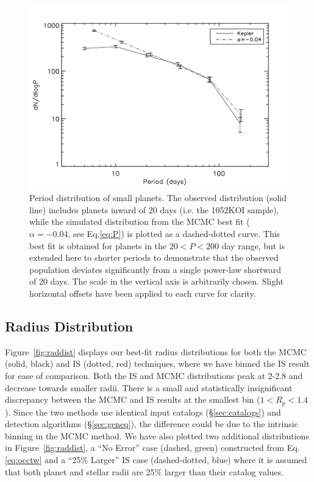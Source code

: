 \begin{figure}[h]
\centerline{\includegraphics[scale=0.55]{chap2/Silburt_period.pdf}}
\caption{Period distribution of \kep{} small planets. The observed
  distribution (solid line) includes planets inward of $20$ days (i.e. the
  1052KOI sample), while the simulated distribution from the MCMC best
  fit ($\alpha = -0.04$, see Eq.\ref{eq:P}) is plotted as a
  dashed-dotted curve. This best fit is obtained for planets in the $20 <
  P < 200$ day range, but is extended here to shorter periods to
  demonstrate that the observed population deviates significantly from
  a single power-law shortward of $20$ days. The scale in the
  vertical axis is arbitrarily chosen.  Slight horizontal offsets have
  been applied to each curve for clarity.}
\label{fig:period}
\end{figure}

\subsection{Radius Distribution}
\label{sec:radiusdist}

Figure~\ref{fig:raddist} displays our best-fit radius distributions
for both the MCMC (solid, black) and IS (dotted, red) techniques,
where we have binned the IS result for ease of comparison.  Both the IS and MCMC
distributions peak at 2-2.8\rearth{} and decrease towards smaller
radii.  There is a small and statistically insignificant discrepancy
between the MCMC and IS results at the smallest bin ($1<R_p<1.4$\rearth{}).  
Since the two methods use
identical input catalogs (\S \ref{sec:catalogs}) and detection
algorithms (\S \ref{sec:geneq}), the difference could be due to the
intrinsic binning in the MCMC method.
We have also plotted two additional distributions in
Figure~\ref{fig:raddist}, a ``No Error'' case (dashed, green)
constructed from Eq.\ref{eq:occtw} and a ``25$\%$ Larger'' IS case
(dashed-dotted, blue) where it is assumed that both planet and stellar
radii are 25$\%$ larger than their catalog values.

